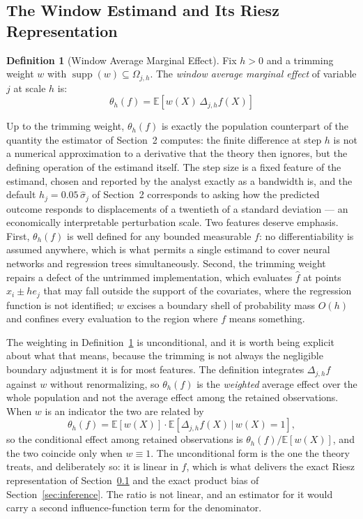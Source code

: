 \documentclass[12pt,a4paper]{article}
\numberwithin{equation}{section}
\theoremstyle{plain}
\theoremstyle{definition}
\newtheorem{definition}{Definition}
\newcommand{\E}{\mathbb{E}}
\newcommand{\Dh}{\Delta_{j,h}}
\begin{document}
	\subsection{The Window Estimand and Its Riesz Representation}
	\label{sec:window}
	
	\begin{definition}[Window Average Marginal Effect]
		\label{def:window}
		Fix $h > 0$ and a trimming weight $w$ with
		$\operatorname{supp}(w) \subseteq \Omega_{j,h}$. The \emph{window average
		marginal effect} of variable $j$ at scale $h$ is:
		\begin{equation}
			\theta_h(f) = \E\left[w(X)\, \Dh f(X)\right]
		\end{equation}
	\end{definition}
	
	Up to the trimming weight, $\theta_h(f)$ is exactly the population counterpart of
	the quantity the estimator of Section~2 computes: the finite difference at step $h$
	is not a numerical approximation to a derivative that the theory then ignores, but
	the defining operation of the estimand itself. The step size is a fixed feature of
	the estimand, chosen and reported by the analyst exactly as a bandwidth is, and the
	default $h_j = 0.05\,\hat{\sigma}_j$ of Section~2 corresponds to asking how the
	predicted outcome responds to displacements of a twentieth of a standard deviation
	--- an economically interpretable perturbation scale. Two features deserve emphasis.
	First, $\theta_h(f)$ is well defined for any bounded measurable $f$: no
	differentiability is assumed anywhere, which is what permits a single estimand to
	cover neural networks and regression trees simultaneously. Second, the trimming
	weight repairs a defect of the untrimmed implementation, which evaluates
	$\hat{f}$ at points $x_i \pm h e_j$ that may fall outside the support of the
	covariates, where the regression function is not identified; $w$ excises a boundary
	shell of probability mass $O(h)$ and confines every evaluation to the region where
	$f$ means something.

	The weighting in Definition~\ref{def:window} is unconditional, and it is
	worth being explicit about what that means, because the trimming is not
	always the negligible boundary adjustment it is for most features. The
	definition integrates $\Dh f$ against $w$ without renormalizing, so
	$\theta_h(f)$ is the \emph{weighted} average effect over the whole
	population and not the average effect among the retained observations. When
	$w$ is an indicator the two are related by
	\begin{equation}
		\theta_h(f) = \E[w(X)] \cdot
		\E\!\left[\Dh f(X) \,\big|\, w(X) = 1\right] ,
		\label{eq:trimscale}
	\end{equation}
	so the conditional effect among retained observations is
	$\theta_h(f)/\E[w(X)]$, and the two coincide only when $w \equiv 1$. The
	unconditional form is the one the theory treats, and deliberately so: it is
	linear in $f$, which is what delivers the exact Riesz representation of
	Section~\ref{sec:window} and the exact product bias of
	Section~\ref{sec:inference}. The ratio is not linear, and an estimator for
	it would carry a second influence-function term for the denominator.
\end{document}
